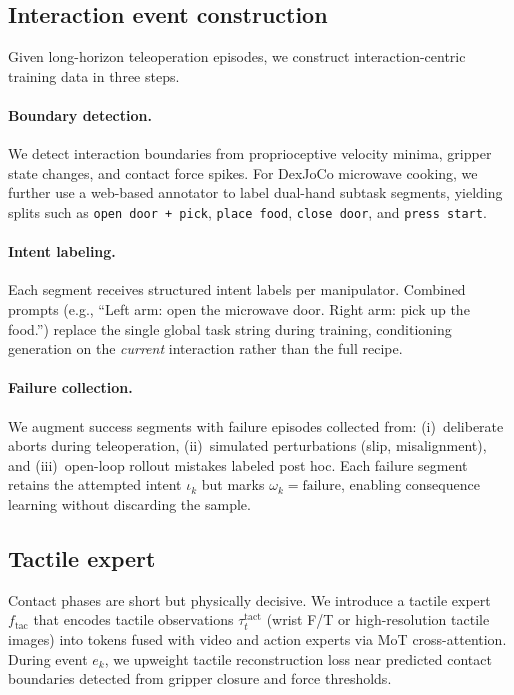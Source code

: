 \documentclass{article}
\begin{document}
\subsection{Interaction event construction}
\label{sec:data}

Given long-horizon teleoperation episodes, we construct interaction-centric training data in three steps.

\paragraph{Boundary detection.}
We detect interaction boundaries from proprioceptive velocity minima, gripper state changes, and contact force spikes.
For DexJoCo microwave cooking, we further use a web-based annotator to label dual-hand subtask segments, yielding splits such as \texttt{open door + pick}, \texttt{place food}, \texttt{close door}, and \texttt{press start}.

\paragraph{Intent labeling.}
Each segment receives structured intent labels per manipulator.
Combined prompts (e.g., ``Left arm: open the microwave door. Right arm: pick up the food.'') replace the single global task string during training, conditioning generation on the \emph{current} interaction rather than the full recipe.

\paragraph{Failure collection.}
We augment success segments with failure episodes collected from:
(i)~deliberate aborts during teleoperation,
(ii)~simulated perturbations (slip, misalignment), and
(iii)~open-loop rollout mistakes labeled post hoc.
Each failure segment retains the attempted intent $\iota_k$ but marks $\omega_k = \text{failure}$, enabling consequence learning without discarding the sample.

\subsection{Tactile expert}
Contact phases are short but physically decisive.
We introduce a tactile expert $f_{\text{tac}}$ that encodes tactile observations $\tau^{\text{tact}}_t$ (wrist F/T or high-resolution tactile images) into tokens fused with video and action experts via MoT cross-attention.
During event $e_k$, we upweight tactile reconstruction loss near predicted contact boundaries detected from gripper closure and force thresholds.
\end{document}
